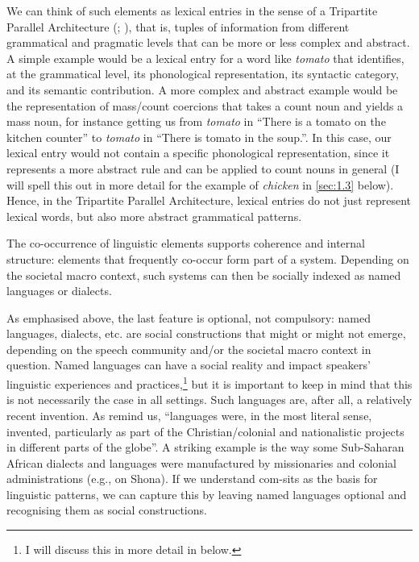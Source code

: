 We can think of such elements as lexical entries in the sense of a Tripartite Parallel Architecture (\cite{Jackendoff1997}; \citeyear{Jackendoff2002}), that is, tuples of information from different grammatical and pragmatic levels that can be more or less complex and abstract. A simple example would be a lexical entry for a word like \textit{tomato} that identifies, at the grammatical level, its phonological representation, its syntactic category, and its semantic contribution. A more complex and abstract example would be the representation of mass/count coercions that takes a count noun and yields a mass noun, for instance getting us from \textit{tomato} in “There is a tomato on the kitchen counter” to \textit{tomato} in “There is tomato in the soup.”. In this case, our lexical entry would not contain a specific phonological representation, since it represents a more abstract rule and can be applied to count nouns in general (I will spell this out in more detail for the example of \textit{chicken} in \ref{sec:1.3} below). Hence, in the Tripartite Parallel Architecture, lexical entries do not just represent lexical words, but also more abstract grammatical patterns.

\hspace*{-2.4pt}The co-occurrence of linguistic elements supports coherence and internal structure: elements that frequently co-occur form part of a system. Depending on the societal macro context, such systems can then be socially indexed as named languages or dialects.




As emphasised above, the last feature is optional, not compulsory: named languages, dialects, etc. are social constructions that might or might not emerge, depending on the speech community and/or the societal macro context in question. Named languages can have a social reality and impact speakers’ linguistic experiences and practices,\footnote{I will discuss this in more detail in  below.} but it is important to keep in mind that this is not necessarily the case in all settings. Such languages are, after all, a relatively recent invention. As \citet[1]{MakoniPennycook2006} remind us, “languages were, in the most literal sense, invented, particularly as part of the Christian/colonial and nationalistic projects in different parts of the globe”. A striking example is the way some Sub-Saharan African dialects and languages were manufactured by missionaries and colonial administrations (e.g., \citealt{MakoniEtAl2007} on Shona). If we understand com-sits as the basis for linguistic patterns, we can capture this by leaving named languages optional and recognising them as social constructions.

